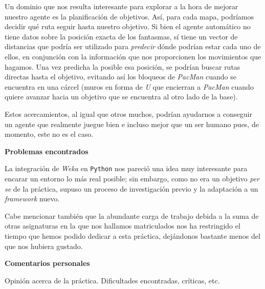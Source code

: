 \documentclass[12pt]{article}
\begin{document}
Un dominio que nos resulta interesante para explorar a la hora de mejorar nuestro agente es la planificación de objetivos. Así, para cada mapa, podríamos decidir qué ruta seguir hasta nuestro objetivo. Si bien el agente automático no tiene datos sobre la posición exacta de los fantasmas, sí tiene un vector de distancias que podría ser utilizado para \emph{predecir} dónde podrían estar cada uno de ellos, en conjunción con la información que nos proporcionen los movimientos que hagamos. Una vez predicha la posible esa posición, se podrían buscar rutas directas hasta el objetivo, evitando así los bloqueos de \emph{PacMan} cuando se encuentra en una cárcel (muros en forma de \emph{U} que encierran a \emph{PacMan} cuando quiere avanzar hacia un objetivo que se encuentra al otro lado de la base).

Estos acercamientos, al igual que otros muchos, podrían ayudarnos a conseguir un agente que realmente juegue bien e incluso mejor que un ser humano pues, de momento, este no es el caso.

\vspace{0.2cm}

\centerline{\textbf{Problemas encontrados}}

\vspace{0.2cm}

La integración de \emph{Weka} en \texttt{Python} nos pareció una idea muy interesante para encarar un entorno lo más real posible; sin embargo, como no era un objetivo \emph{per se} de la práctica, supuso un proceso de investigación previo y la adaptación a un \emph{framework} nuevo.

Cabe mencionar también que la abundante carga de trabajo debida a la suma de otras asignaturas en la que nos hallamos matriculados nos ha restringido el tiempo que hemos podido dedicar a esta práctica, dejándonos bastante menos del que nos hubiera gustado.

\vspace{0.2cm}

\centerline{\textbf{Comentarios personales}}

\vspace{0.2cm}

Opinión acerca de la práctica. Dificultades encontradas, críticas, etc.
\end{document}
